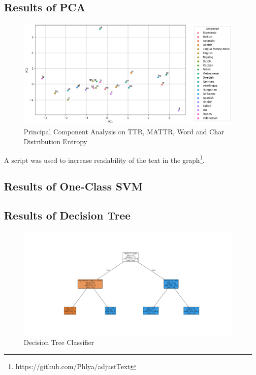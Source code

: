 \documentclass[12pt,a4paper]{article}
\numberwithin{figure}{section}
\numberwithin{table}{section}
\numberwithin{definition}{section}
\begin{document}
\subsection{Results of PCA}
\label{ssec:pcaresults}

\begin{figure}
  \centering
        \includegraphics[width=1.0\textwidth]{pcaanalysis.png}
        \caption{Principal Component Analysis on TTR, MATTR, Word and Char Distribution Entropy}
        \label{fig:pcaanalysis}
\end{figure}


A script was used to increase readability of the text in the graph\footnote{https://github.com/Phlya/adjustText}.

\subsection{Results of One-Class SVM}
\label{ssec:oneclasssvmresults}

\subsection{Results of Decision Tree}
\label{ssec:decisiontreeresults}

\begin{figure}
  \centering
        \includegraphics[width=1.0\textwidth]{decisiontree.png}
        \caption{Decision Tree Classifier}
        \label{fig:decisiontree}
\end{figure}
\end{document}
